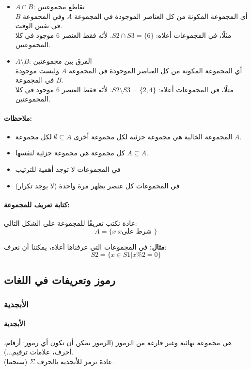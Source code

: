 \documentclass[12pt]{article}
\begin{document}
\begin{itemize}
\item $A \cap B$: تقاطع مجموعتين \\
أي المجموعة المكونة من كل العناصر الموجودة في المجموعة $A$ وفي المجموعة $B$ في نفس الوقت. \\
مثلًا، في المجموعات أعلاه: $S2 \cap S3 = \{6 \}$. لأنّه فقط العنصر 6 موجود في كلا المجموعتين.

\item $A \setminus B$: الفرق بين مجموعتين \\
أي المجموعة المكونة من كل العناصر الموجودة في المجموعة $A$ وليست موجودة في المجموعة $B$. \\
مثلًا، في المجموعات أعلاه: $S2 \setminus  S3 = \{2, 4 \}$. لأنّه فقط العنصر 6 موجود في كلا المجموعتين.

\end{itemize}

\paragraph{ملاحظات:}
\begin{itemize}
    \item المجموعة الخالية هي مجموعة جزئية لكل مجموعة أخرى $\emptyset \subseteq A$ لكل مجموعة $A$.
    \item كل مجموعة هي مجموعة جزئية لنفسها $A \subseteq A$.
    \item في المجموعات لا توجد أهمية للترتيب
    \item في المجموعات كل عنصر يظهر مرة واحدة (لا يوجد تكرار)
\end{itemize}

\paragraph{كتابة تعريف للمجموعة:}
عادة نكتب تعريفًا للمجموعة على الشكل التالي:
$$A = \{ x | x \text{شرط على } \}$$

\textbf{مثال:}
في المجموعات التي عرفناها أعلاه، يمكننا أن نعرف:
$$S2 = \{ x \in S1 | x\%2=0 \}$$


\subsection{رموز وتعريفات في اللغات}

\subsubsection{الأبجدية}

\paragraph{الأبجدية} هي مجموعة نهائية وغير فارغة من الرموز (الرموز يمكن أن تكون أي رموز: أرقام، أحرف، علامات ترقيم...). \\
عادة نرمز للأبجدية بالحرف $\Sigma$ (سيجما).
\end{document}
